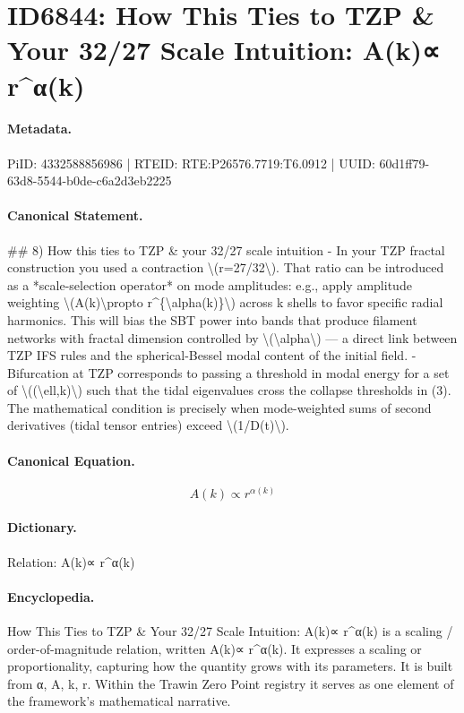 \section*{ID6844: How This Ties to TZP \& Your 32/27 Scale Intuition: A(k)∝ r\textasciicircum{}α(k)}
\paragraph{Metadata.}
PiID: 4332588856986 | RTEID: RTE:P26576.7719:T6.0912 | UUID: 60d1ff79-63d8-5544-b0de-c6a2d3eb2225

\paragraph{Canonical Statement.}
\#\# 8) How this ties to TZP \& your 32/27 scale intuition - In your TZP fractal construction you used a contraction \textbackslash{}(r=27/32\textbackslash{}). That ratio can be introduced as a *scale-selection operator* on mode amplitudes: e.g., apply amplitude weighting \textbackslash{}(A(k)\textbackslash{}propto r\textasciicircum{}\{\textbackslash{}alpha(k)\}\textbackslash{}) across k shells to favor specific radial harmonics. This will bias the SBT power into bands that produce filament networks with fractal dimension controlled by \textbackslash{}(\textbackslash{}alpha\textbackslash{}) — a direct link between TZP IFS rules and the spherical-Bessel modal content of the initial field. - Bifurcation at TZP corresponds to passing a threshold in modal energy for a set of \textbackslash{}((\textbackslash{}ell,k)\textbackslash{}) such that the tidal eigenvalues cross the collapse thresholds in (3). The mathematical condition is precisely when mode-weighted sums of second derivatives (tidal tensor entries) exceed \textbackslash{}(1/D(t)\textbackslash{}).

\paragraph{Canonical Equation.}
\[
A(k)\propto r^{\alpha(k)}
\]

\paragraph{Dictionary.}
Relation: A(k)∝ r\textasciicircum{}α(k)

\paragraph{Encyclopedia.}
How This Ties to TZP \& Your 32/27 Scale Intuition: A(k)∝ r\textasciicircum{}α(k) is a scaling / order-of-magnitude relation, written A(k)∝ r\textasciicircum{}α(k). It expresses a scaling or proportionality, capturing how the quantity grows with its parameters. It is built from α, A, k, r. Within the Trawin Zero Point registry it serves as one element of the framework's mathematical narrative.
